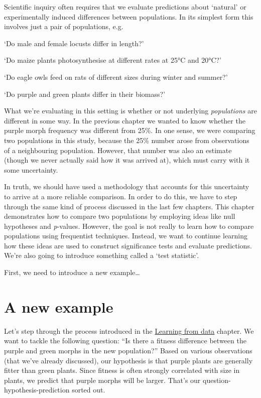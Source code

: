 \documentclass[]{book}
\begin{document}
Scientific inquiry often requires that we evaluate predictions about
`natural' or experimentally induced differences between populations. In
its simplest form this involves just a pair of populations, e.g.

`Do male and female locusts differ in length?'

`Do maize plants photosynthesise at different rates at 25°C and 20°C?'

`Do eagle owls feed on rats of different sizes during winter and
summer?'

`Do purple and green plants differ in their biomass?'

What we're evaluating in this setting is whether or not underlying
\emph{populations} are different in some way. In the previous chapter we
wanted to know whether the purple morph frequency was different from
25\%. In one sense, we were comparing two populations in this study,
because the 25\% number arose from observations of a neighbouring
population. However, that number was also an estimate (though we never
actually said how it was arrived at), which must carry with it some
uncertainty.

In truth, we should have used a methodology that accounts for this
uncertainty to arrive at a more reliable comparison. In order to do
this, we have to step through the same kind of process discussed in the
last few chapters. This chapter demonstrates how to compare two
populations by employing ideas like null hypotheses and \emph{p}-values.
However, the goal is not really to learn how to compare populations
using frequentist techniques. Instead, we want to continue learning how
these ideas are used to construct significance tests and evaluate
predictions. We're also going to introduce something called a `test
statistic'.

First, we need to introduce a new example\ldots{}

\section{A new example}\label{morph-weights-eg}

Let's step through the process introduced in the
\protect\hyperlink{learning-from-data}{Learning from data} chapter. We
want to tackle the following question: ``Is there a fitness difference
between the purple and green morphs in the new population?'' Based on
various observations (that we've already discussed), our hypothesis is
that purple plants are generally fitter than green plants. Since fitness
is often strongly correlated with size in plants, we predict that purple
morphs will be larger. That's our question-hypothesis-prediction sorted
out.
\end{document}
